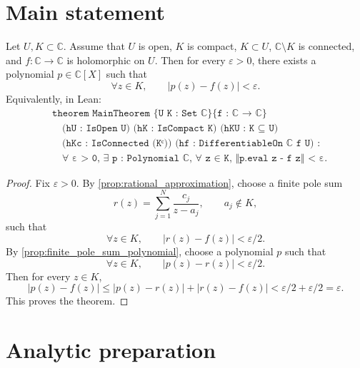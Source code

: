 
\newcommand{\C}{\mathbb{C}}
\newcommand{\eps}{\varepsilon}
\newcommand{\dist}{\operatorname{dist}}



\section{Main statement}

\begin{theorem}
    \label{thm:main}
    Let \(U,K \subset \C\). Assume that \(U\) is open, \(K\) is compact,
    \(K \subset U\), \(\C \setminus K\) is connected, and \(f : \C \to \C\) is
    holomorphic on \(U\). Then for every \(\eps > 0\), there exists a polynomial
    \(p \in \C[X]\) such that
    \[
      \forall z \in K,\qquad |p(z)-f(z)| < \eps .
    \]
    Equivalently, in Lean:
    \[
    \begin{aligned}
    &\texttt{theorem MainTheorem \{U K : Set ℂ\} \{f : ℂ → ℂ\}}\\
    &\quad \texttt{(hU : IsOpen U) (hK : IsCompact K) (hKU : K ⊆ U)}\\
    &\quad \texttt{(hKc : IsConnected (Kᶜ)) (hf : DifferentiableOn ℂ f U) :}\\
    &\quad \texttt{∀ ε > 0, ∃ p : Polynomial ℂ, ∀ z ∈ K, ‖p.eval z - f z‖ < ε.}
    \end{aligned}
    \]
\end{theorem}

\begin{proof}
    Fix \(\eps > 0\). By \cref{prop:rational_approximation}, choose a finite pole
    sum
    \[
      r(z) = \sum_{j=1}^N \frac{c_j}{z-a_j},
      \qquad a_j \notin K,
    \]
    such that
    \[
      \forall z \in K,\qquad |r(z)-f(z)| < \eps/2 .
    \]
    By \cref{prop:finite_pole_sum_polynomial}, choose a polynomial \(p\) such that
    \[
      \forall z \in K,\qquad |p(z)-r(z)| < \eps/2 .
    \]
    Then for every \(z \in K\),
    \[
      |p(z)-f(z)|
      \le |p(z)-r(z)| + |r(z)-f(z)|
      < \eps/2+\eps/2
      = \eps .
    \]
    This proves the theorem.
\end{proof}

\section{Analytic preparation}

